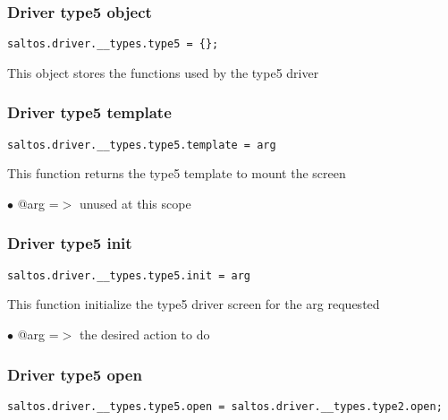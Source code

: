 \documentclass[a4paper]{article}
\begin{document}
\hypertarget{toc759}{}
\subsubsection{Driver type5 object}

\begin{lstlisting}
saltos.driver.__types.type5 = {};
\end{lstlisting}

This object stores the functions used by the type5 driver

\hypertarget{toc760}{}
\subsubsection{Driver type5 template}

\begin{lstlisting}
saltos.driver.__types.type5.template = arg
\end{lstlisting}

This function returns the type5 template to mount the screen

\begin{compactitem}
\item[\color{myblue}$\bullet$] @arg =$>$ unused at this scope
\end{compactitem}

\hypertarget{toc761}{}
\subsubsection{Driver type5 init}

\begin{lstlisting}
saltos.driver.__types.type5.init = arg
\end{lstlisting}

This function initialize the type5 driver screen for the arg requested

\begin{compactitem}
\item[\color{myblue}$\bullet$] @arg =$>$ the desired action to do
\end{compactitem}

\hypertarget{toc762}{}
\subsubsection{Driver type5 open}

\begin{lstlisting}
saltos.driver.__types.type5.open = saltos.driver.__types.type2.open;
\end{lstlisting}
\end{document}
